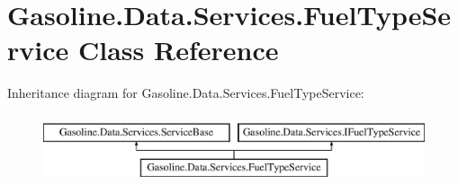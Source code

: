 \hypertarget{class_gasoline_1_1_data_1_1_services_1_1_fuel_type_service}{}\section{Gasoline.\+Data.\+Services.\+Fuel\+Type\+Service Class Reference}
\label{class_gasoline_1_1_data_1_1_services_1_1_fuel_type_service}
Inheritance diagram for Gasoline.\+Data.\+Services.\+Fuel\+Type\+Service\+:\begin{figure}[H]
\begin{center}
\leavevmode
\includegraphics[height=2.000000cm]{class_gasoline_1_1_data_1_1_services_1_1_fuel_type_service}
\end{center}
\end{figure}
